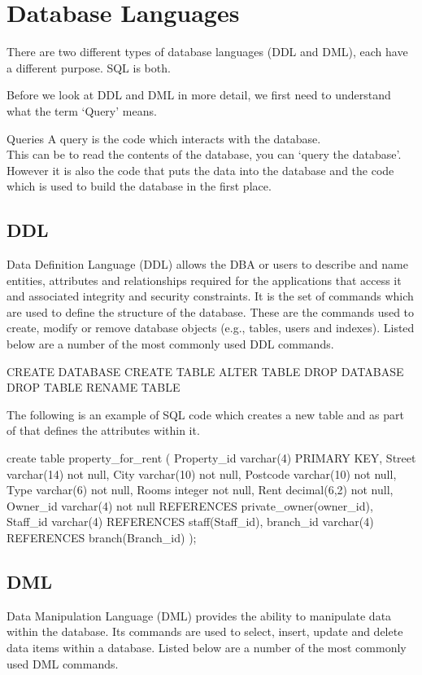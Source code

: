 \section*{Database Languages}
There are two different types of database languages (DDL and DML), each have a different purpose. SQL is both.

Before we look at DDL and DML in more detail, we first need to understand what the term `Query' means.
\begin{keyconcept}{Queries}
A query is the code which interacts with the database. \\ This can be to read the contents of the database, you can `query the database'. However it is also the code that puts the data into the database and the code which is used to build the database in the first place. 
\end{keyconcept}
\subsection*{DDL}
Data Definition Language (DDL) allows the DBA or users to describe and name entities, attributes and relationships required for the applications that access it and associated integrity and security constraints. It is the set of commands which are used to define the structure of the database. These are the commands used to create, modify or remove database objects (e.g., tables, users and indexes). Listed below are a number of the most commonly used DDL commands.
\begin{sql}
CREATE DATABASE
CREATE TABLE
ALTER TABLE
DROP DATABASE
DROP TABLE
RENAME TABLE
\end{sql}
The following is an example of SQL code which creates a new table and as part of that defines the attributes within it.
\begin{sql}
create table property_for_rent (
    Property_id varchar(4) PRIMARY KEY,
    Street varchar(14) not null,
    City varchar(10) not null,
    Postcode varchar(10) not null,
    Type varchar(6) not null,
    Rooms integer not null,
    Rent decimal(6,2) not null,
    Owner_id varchar(4) not null REFERENCES private_owner(owner_id),
    Staff_id varchar(4) REFERENCES staff(Staff_id),
    branch_id varchar(4) REFERENCES branch(Branch_id)
);
\end{sql}

\subsection*{DML}
Data Manipulation Language (DML) provides the ability to manipulate data within the database. Its commands are used to select, insert, update and delete data items within a database. Listed below are a number of the most commonly used DML commands.

